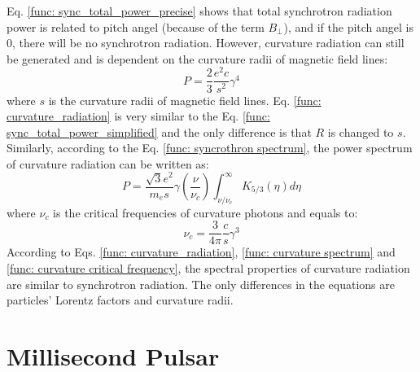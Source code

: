 \documentclass[12pt]{report}
\begin{document}
          Eq. \ref{func: sync_total_power_precise} shows that total synchrotron radiation 
          power is related to pitch angel (because of the term $B_\perp$), and if the 
          pitch angel is $0$, there will be no synchrotron radiation. However, curvature 
          radiation can still be generated and is dependent on the curvature radii of 
          magnetic field lines:
          \begin{equation}
            \label{func: curvature_radiation}
            P = \frac{2}{3}\frac{e^2c}{s^2}\gamma^4
          \end{equation}
          where $s$ is the curvature radii of magnetic field lines. 
          Eq. \ref{func: curvature_radiation} is very similar to the Eq. 
          \ref{func: sync_total_power_simplified} and the only difference is that 
          $R$ is changed to $s$. Similarly, according to the Eq. 
          \ref{func: syncrothron spectrum}, the power spectrum of curvature radiation can 
          be written as:
          \begin{equation}
            \label{func: curvature spectrum}
            P = \frac{\sqrt{3}e^2}{m_es}\gamma \left(\frac{\nu}{\nu_c}\right) \int_{\nu / \nu_c}^{\infty} K_{5/3}\left(\eta \right)d\eta
          \end{equation}
          where $\nu_c$ is the critical frequencies of curvature photons and equals to:
          \begin{equation}
            \label{func: curvature critical frequency}
            \nu_c = \frac{3}{4\pi}\frac{c}{s}\gamma^3
          \end{equation}
          According to Eqs. \ref{func: curvature_radiation}, \ref{func: curvature spectrum} 
          and \ref{func: curvature critical frequency}, the spectral properties of curvature 
          radiation are similar to synchrotron radiation. The only differences in the 
          equations are particles' Lorentz factors and curvature radii. 

        

      \section{Millisecond Pulsar} 
\end{document}
